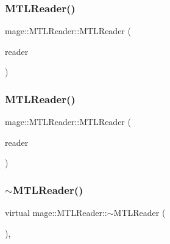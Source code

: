 \hypertarget{classmage_1_1_m_t_l_reader_adcc57156298b2198c24c041503df2e6d}{}\label{classmage_1_1_m_t_l_reader_adcc57156298b2198c24c041503df2e6d} 
\subsubsection{\texorpdfstring{M\+T\+L\+Reader()}{MTLReader()}\hspace{0.1cm}{\footnotesize\ttfamily [2/3]}}
{\footnotesize\ttfamily mage\+::\+M\+T\+L\+Reader\+::\+M\+T\+L\+Reader (\begin{DoxyParamCaption}\item[{const \hyperlink{classmage_1_1_m_t_l_reader}{M\+T\+L\+Reader} \&}]{reader }\end{DoxyParamCaption})\hspace{0.3cm}{\ttfamily [delete]}}

\hypertarget{classmage_1_1_m_t_l_reader_ae78095773cf6c4cb697605b395fdfc60}{}\label{classmage_1_1_m_t_l_reader_ae78095773cf6c4cb697605b395fdfc60} 
\subsubsection{\texorpdfstring{M\+T\+L\+Reader()}{MTLReader()}\hspace{0.1cm}{\footnotesize\ttfamily [3/3]}}
{\footnotesize\ttfamily mage\+::\+M\+T\+L\+Reader\+::\+M\+T\+L\+Reader (\begin{DoxyParamCaption}\item[{\hyperlink{classmage_1_1_m_t_l_reader}{M\+T\+L\+Reader} \&\&}]{reader }\end{DoxyParamCaption})\hspace{0.3cm}{\ttfamily [delete]}}

\hypertarget{classmage_1_1_m_t_l_reader_af07011b505c88680a8381c00cb512242}{}\label{classmage_1_1_m_t_l_reader_af07011b505c88680a8381c00cb512242} 
\subsubsection{\texorpdfstring{$\sim$\+M\+T\+L\+Reader()}{~MTLReader()}}
{\footnotesize\ttfamily virtual mage\+::\+M\+T\+L\+Reader\+::$\sim$\+M\+T\+L\+Reader (\begin{DoxyParamCaption}{ }\end{DoxyParamCaption})\hspace{0.3cm}{\ttfamily [virtual]}, {\ttfamily [default]}}



